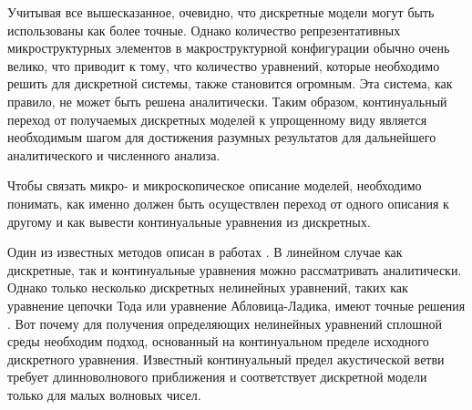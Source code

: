 Учитывая все вышесказанное, очевидно, что дискретные модели могут быть использованы как более точные. Однако количество репрезентативных микроструктурных элементов в макроструктурной конфигурации обычно очень велико, что приводит к тому, что количество уравнений, которые необходимо решить для дискретной системы, также становится огромным. Эта система, как правило, не может быть решена аналитически. Таким образом, континуальный переход от получаемых дискретных моделей к упрощенному виду является необходимым шагом для достижения разумных результатов для дальнейшего аналитического и численного анализа.
	
Чтобы связать микро- и микроскопическое описание моделей, необходимо понимать, как именно должен быть осуществлен переход от одного описания к другому и как вывести континуальные уравнения из дискретных.
	
Один из известных методов описан в работах \cite{AskMetr, SuiMetr}. В линейном случае как дискретные, так и континуальные уравнения можно рассматривать аналитически. Однако только несколько дискретных нелинейных уравнений, таких как уравнение цепочки Тода или уравнение Абловица-Ладика, имеют точные решения \cite {Ablowitz}. Вот почему для получения определяющих нелинейных уравнений сплошной среды необходим подход, основанный на континуальном пределе исходного дискретного уравнения. Известный континуальный предел акустической ветви требует длинноволнового приближения и соответствует дискретной модели только для малых волновых чисел.
	
